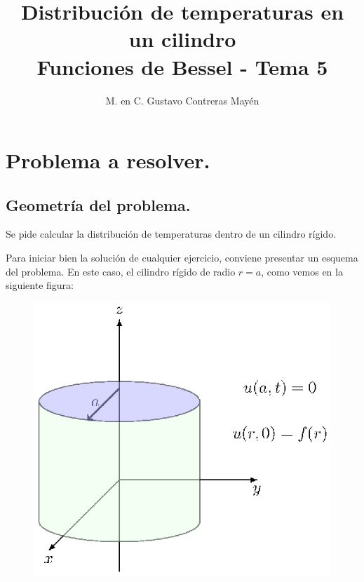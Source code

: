 
\title{Distribución de temperaturas en un cilindro \\ \large {Funciones de Bessel - Tema 5} \vspace{-3ex}}
\author{M. en C. Gustavo Contreras Mayén}
\date{ }

\pagestyle{fancy}
\fancyhf{}
\lhead{\leftmark}
\rfoot{\thepage}
\setlength{\headheight}{16pt}%

\def\changemargin#1#2{\list{}{\rightmargin#2\leftmargin#1}\item[]}
\let\endchangemargin=\endlist 



\maketitle
\fontsize{14}{14}\selectfont
\tableofcontents
\newpage

\section{Problema a resolver.}
\subsection{Geometría del problema.}

Se pide calcular la distribución de temperaturas dentro de un cilindro rígido.
\par
Para iniciar bien la solución de cualquier ejercicio, conviene presentar un esquema del problema. En este caso, el cilindro rígido de radio $r = a$, como vemos en la siguiente figura:
\begin{figure}[H]
    \centering
    \includegraphics[scale=1]{Imagenes/plot_cilindro_Bessel_01.eps}
\end{figure}

